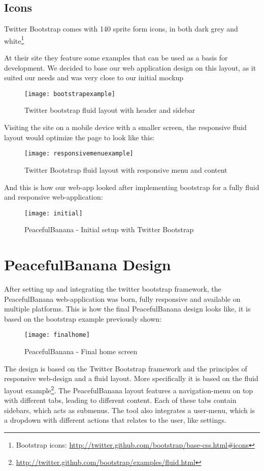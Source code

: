\subsection{Icons}
Twitter Bootstrap comes with 140 sprite form icons, in both dark grey and white\footnote{Bootstrap icons: \url{http://twitter.github.com/bootstrap/base-css.html\#icons}} 

\newpage
At their site they feature some examples that can be used as a basis for development. We decided to base our web application design on this layout, as it suited our needs and was very close to our initial mockup
\begin{figure}[h!]
\centering
	\texttt{[image: bootstrapexample]}
\caption{Twitter bootstrap fluid layout with header and sidebar}
\label{bootstrapexample}
\end{figure}

Visiting the site on a mobile device with a smaller screen, the responsive fluid layout would optimize the page to look like this:
\begin{figure}[h!]
\centering
	\texttt{[image: responsivemenuexample]}
\caption{Twitter Bootstrap fluid layout with responsive menu and content}
\label{bootstrapresponsive}
\end{figure}
\newpage
And this is how our web-app looked after implementing bootstrap for a fully fluid and responsive web-application:
\begin{figure}[h!]
\centering
	\texttt{[image: initial]}
\caption{PeacefulBanana - Initial setup with Twitter Bootstrap}
\label{teamscreen}
\end{figure}

\section{PeacefulBanana Design}
After setting up and integrating the twitter bootstrap framework, the PeacefulBanana web-application was born, fully responsive and available on multiple platforms. This is how the final PeacefulBanana design looks like, it is based on the bootstrap example previously shown:
\begin{figure}[h!]
\centering
	\texttt{[image: finalhome]}
\caption{PeacefulBanana - Final home screen}
\label{finalhome}
\end{figure}
The design is based on the Twitter Bootstrap framework and the principles of responsive web-design and a fluid layout. More specifically it is based on the fluid layout example\footnote{\url{http://twitter.github.com/bootstrap/examples/fluid.html}}. The PeacefulBanana layout features a navigation-menu on top with different tabs, leading to different content. Each of these tabs contain sidebars, which acts as submenus. The tool also integrates a user-menu, which is a dropdown with different actions that relates to the user, like settings. 

